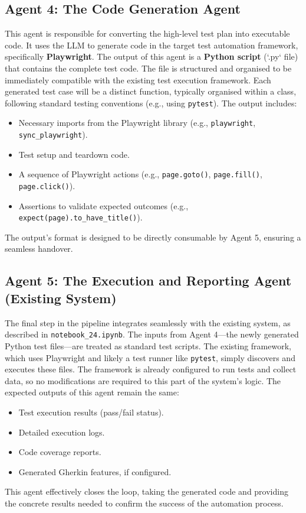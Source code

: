 \documentclass{article}
\begin{document}
\subsection{Agent 4: The Code Generation Agent}
This agent is responsible for converting the high-level test plan into executable code. It uses the LLM to generate code in the target test automation framework, specifically \textbf{Playwright}. The output of this agent is a \textbf{Python script} (`.py` file) that contains the complete test code. The file is structured and organised to be immediately compatible with the existing test execution framework. Each generated test case will be a distinct function, typically organised within a class, following standard testing conventions (e.g., using \texttt{pytest}). The output includes:
\begin{itemize}
    \item Necessary imports from the Playwright library (e.g., \texttt{playwright}, \texttt{sync\_playwright}).
    \item Test setup and teardown code.
    \item A sequence of Playwright actions (e.g., \texttt{page.goto()}, \texttt{page.fill()}, \texttt{page.click()}).
    \item Assertions to validate expected outcomes (e.g., \texttt{expect(page).to\_have\_title()}).
\end{itemize}
The output's format is designed to be directly consumable by Agent 5, ensuring a seamless handover.

\subsection{Agent 5: The Execution and Reporting Agent (Existing System)}
The final step in the pipeline integrates seamlessly with the existing system, as described in \texttt{notebook\_24.ipynb}. The inputs from Agent 4---the newly generated Python test files---are treated as standard test scripts. The existing framework, which uses Playwright and likely a test runner like \texttt{pytest}, simply discovers and executes these files. The framework is already configured to run tests and collect data, so no modifications are required to this part of the system's logic. The expected outputs of this agent remain the same:
\begin{itemize}
    \item Test execution results (pass/fail status).
    \item Detailed execution logs.
    \item Code coverage reports.
    \item Generated Gherkin features, if configured.
\end{itemize}
This agent effectively closes the loop, taking the generated code and providing the concrete results needed to confirm the success of the automation process.
\end{document}

